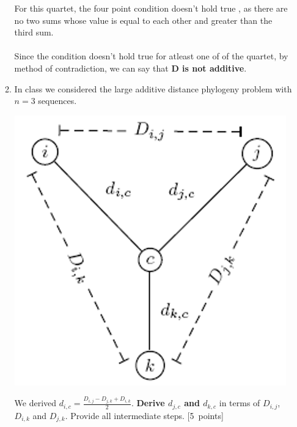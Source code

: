 \begin{enumerate}
\begin{enumerate}
{{For this quartet, the four point condition doesn't hold true , as there are no two sums whose value is equal to each other and greater than the third sum.\\\\
Since the condition doesn't hold true for atleast one of of the quartet, by method of contradiction, we can say that \textbf{D is not additive}.
\vspace{4cm}
}}


\clearpage

\item In class we considered the large additive distance phylogeny problem with $n=3$ sequences.

\begin{center}
    \includegraphics[width=.3\textwidth]{n_equals_3.png}
\end{center}

We derived $d_{i,c} = \frac{D_{i,j} - D_{j,k} + D_{i,k}}{2}$.
\textbf{Derive $d_{j,c}$ and $d_{k,c}$} in terms of $D_{i,j}$, $D_{i,k}$ and $D_{j,k}$.
Provide all intermediate steps.
[5~points]

\end{enumerate}
\end{enumerate}
